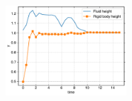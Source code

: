 \begin{figure}[!htpb]
  \centering
  \includegraphics[width=0.4\textwidth]{figures/rfc/figures/dinesh_2022_body_in_hs_tank_2d/ycom}
  \caption{}
\label{fig:disp-falling-solid-in-water}
\end{figure}







